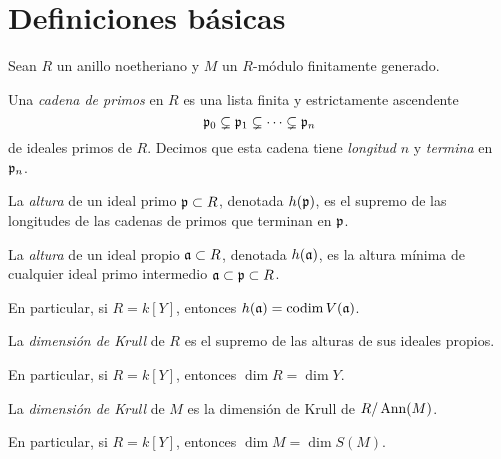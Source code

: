 \section{Definiciones básicas}

\begin{preliminaries}
Sean $R$ un anillo noetheriano y $M$ un $R$-módulo finitamente generado.
\end{preliminaries}

\begin{definition}
Una \textit{cadena de primos} en $R$ es una lista finita y estrictamente ascendente
$$\mathfrak p_0 \subsetneq \mathfrak p_1 \subsetneq \dots \subsetneq \mathfrak p_n$$
de ideales primos de $R$. Decimos que esta cadena tiene \textit{longitud} $n$ y \textit{termina} en $\mathfrak p_n$.
\end{definition}

\begin{definition}
La \textit{altura} de un ideal primo $\mathfrak p \subset R$, denotada $h(\mathfrak p)$, es el supremo de las longitudes de las cadenas de primos que terminan en $\mathfrak p$.
\end{definition}

\begin{definition}
La \textit{altura} de un ideal propio $\mathfrak a \subset R$, denotada $h(\mathfrak a)$, es la altura mínima de cualquier ideal primo intermedio $\mathfrak a \subset \mathfrak p \subset R$.
\end{definition}

\begin{remark}
En particular, si $R = k[Y]$, entonces $h(\mathfrak a) = \operatorname{codim} V(\mathfrak a)$.
\end{remark}

\begin{definition}
La \textit{dimensión de Krull} de $R$ es el supremo de las alturas de sus ideales propios.
\end{definition}

\begin{remark}
En particular, si $R = k[Y]$, entonces $\dim R = \dim Y$.
\end{remark}

\begin{definition}
La \textit{dimensión de Krull} de $M$ es la dimensión de Krull de $R / \operatorname{Ann}(M)$.
\end{definition}

\begin{remark}
En particular, si $R = k[Y]$, entonces $\dim M = \dim S(M)$.
\end{remark}
